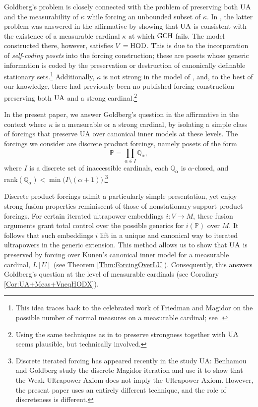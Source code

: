 \documentclass{article}
\theoremstyle{definition}
\theoremstyle{plain}
\newcommand{\po}{\mathbb{P}}
\newcommand{\qo}{\mathbb{Q}}
\begin{document}
Goldberg's problem is closely connected with the problem of preserving both ${\rm UA}$ and the measurability of $\kappa$ while forcing an unbounded subset of $\kappa$. In \cite{BenNeriaKaplan}, the latter problem was answered in the affirmative by showing that ${\rm UA}$ is consistent with the existence of a measurable cardinal $\kappa$ at which ${\rm GCH}$ fails. The model constructed there, however, satisfies $V={\rm HOD}$. This is due to the incorporation of \textit{self-coding posets} into the forcing construction; these are posets whose generic information is coded by the preservation or destruction of canonically definable stationary sets.\footnote{This idea traces back to the celebrated work of Friedman and Magidor on the possible number of normal measures on a measurable cardinal; see \cite{FriedmanMagidor}.} Additionally, $\kappa$ is not strong in the model of \cite{BenNeriaKaplan}, and, to the best of our knowledge, there had previously been no published forcing construction preserving both ${\rm UA}$ and a strong cardinal.\footnote{Using the same techniques as in \cite{BenNeriaKaplan} to preserve strongness together with ${\rm UA}$ seems plausible, but technically involved.}


In the present paper, we answer Goldberg's question in the affirmative in the context where $\kappa$ is a measurable or a strong cardinal, by isolating a simple class of forcings that preserve {\rm UA} over canonical inner models at these levels. The forcings we consider are discrete product forcings, namely posets of the form
$$\po=\prod_{\alpha\in I}\qo_\alpha,$$
where $I$ is a discrete set of inaccessible cardinals, each $\qo_\alpha$ is $\alpha$-closed, and $\text{rank}(\qo_\alpha)<\min\bigl(I\setminus(\alpha+1)\bigr)$.\footnote{Discrete iterated forcing has appeared recently in the study \rm{UA}: Benhamou and Goldberg \cite{goldbergbenhamou2024applications} study the discrete Magidor iteration and use it to show that the Weak Ultrapower Axiom does not imply the Ultrapower Axiom. However, the present paper uses an entirely different technique, and the role of discreteness is different.}

Discrete product forcings admit a particularly simple presentation, yet enjoy strong fusion properties reminiscent of those of nonstationary-support product forcings. For certain iterated ultrapower embeddings $i\colon V\to M$, these fusion arguments grant total control over the possible generics for $i(\po)$ over $M$. It follows that such embeddings $i$ lift in a unique and canonical way to iterated ultrapowers in the generic extension. This method allows us to show that ${\rm UA}$ is preserved by forcing over Kunen's canonical inner model for a measurable cardinal, $L[U]$ (see Theorem \ref{Thm:ForcingOverLU}). Consequently, this answers Goldberg's question at the level of measurable cardinals (see Corollary \ref{Cor:UA+Meas+VneqHODX}).
\end{document}
